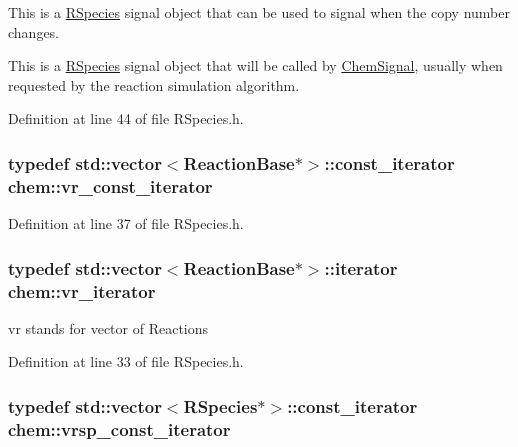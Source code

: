 This is a \hyperlink{classchem_1_1RSpecies}{R\-Species} signal object that can be used to signal when the copy number changes. 

This is a \hyperlink{classchem_1_1RSpecies}{R\-Species} signal object that will be called by \hyperlink{classchem_1_1ChemSignal}{Chem\-Signal}, usually when requested by the reaction simulation algorithm. 

Definition at line 44 of file R\-Species.\-h.

\hypertarget{namespacechem_a37ac14ea0688e0f1bc93f320f1240a74}{
\subsubsection[{vr\-\_\-const\-\_\-iterator}]{\setlength{\rightskip}{0pt plus 5cm}typedef std\-::vector$<${\bf Reaction\-Base}$\ast$$>$\-::const\-\_\-iterator {\bf chem\-::vr\-\_\-const\-\_\-iterator}}}\label{namespacechem_a37ac14ea0688e0f1bc93f320f1240a74}


Definition at line 37 of file R\-Species.\-h.

\hypertarget{namespacechem_a0decff3bb0047ac3a45bc12163f063e4}{
\subsubsection[{vr\-\_\-iterator}]{\setlength{\rightskip}{0pt plus 5cm}typedef std\-::vector$<${\bf Reaction\-Base}$\ast$$>$\-::iterator {\bf chem\-::vr\-\_\-iterator}}}\label{namespacechem_a0decff3bb0047ac3a45bc12163f063e4}


vr stands for vector of Reactions 



Definition at line 33 of file R\-Species.\-h.

\hypertarget{namespacechem_ab6ba36c9953625b15ff4105e1cdfdb86}{
\subsubsection[{vrsp\-\_\-const\-\_\-iterator}]{\setlength{\rightskip}{0pt plus 5cm}typedef std\-::vector$<${\bf R\-Species}$\ast$$>$\-::const\-\_\-iterator {\bf chem\-::vrsp\-\_\-const\-\_\-iterator}}}\label{namespacechem_ab6ba36c9953625b15ff4105e1cdfdb86}


